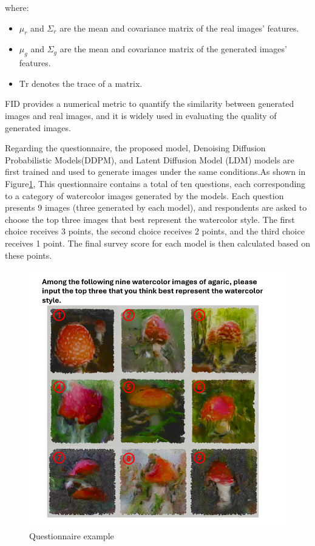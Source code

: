 \documentclass[12pt]{report}
\begin{document}
where:
\begin{itemize}
  \item \(\mu_r\) and \(\Sigma_r\) are the mean and covariance matrix of the real images' features.
  \item \(\mu_g\) and \(\Sigma_g\) are the mean and covariance matrix of the generated images' features.
  \item \(\text{Tr}\) denotes the trace of a matrix.
\end{itemize}

FID provides a numerical metric to quantify the similarity between generated images and real images, and it is widely used in evaluating the quality of generated images.

Regarding the questionnaire, the proposed model, Denoising Diffusion Probabilistic Models(DDPM), and Latent Diffusion Model (LDM) models are first trained and used to generate images under the same conditions.As shown in Figure\ref{fig:questionnaire}, This questionnaire contains a total of ten questions, each corresponding to a category of watercolor images generated by the models. Each question presents 9 images (three generated by each model), and respondents are asked to choose the top three images that best represent the watercolor style. The first choice receives 3 points, the second choice receives 2 points, and the third choice receives 1 point. The final survey score for each model is then calculated based on these points.
\begin{figure}[thbp]
    \centering
    \includegraphics[width=13cm]{image/questionnaire.pdf}
    \caption{Questionnaire example}
    \label{fig:questionnaire}
\end{figure}
\end{document}
